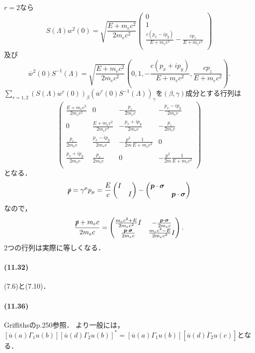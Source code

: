 $r=2$なら
\[S(\Lambda)w^2(0)=\sqrt{\frac{E + m_ec^2}{2m_ec^2}}
\begin{pmatrix}
  0\\
  1\\
  \frac{c(p_x - ip_y)}{E + m_ec^2}
   - \frac{cp_z}{E + m_ec^2}\\
\end{pmatrix}
\]
及び
\[\overline{w}^2(0)S^{ - 1}(\Lambda)=\sqrt{\frac{E + m_ec^2}{2m_ec^2}}\left(0,1, - \frac{c(p_x + ip_y)}{E + m_ec^2},\frac{cp_z}{E + m_ec^2}\right). \]
$\sum_{r=1,2}(S(\Lambda)w^r(0))_\beta(\overline{w}^r(0)S^{ - 1}(\Lambda))_\gamma$を$(\beta,\gamma)$成分とする行列は
\[
\begin{pmatrix}
  \frac{E + m_ec^2}{2m_ec^2} & 0 &  - \frac{p_z}{2m_ec} &  - \frac{p_x - ip_y}{2m_ec}\\
  0 & \frac{E + m_ec^2}{2m_ec^2} &  - \frac{p_x + ip_y}{2m_ec} &  - \frac{p_z}{2m_ec}\\
  \frac{p_z}{2m_ec} & \frac{p_x - ip_y}{2m_ec} &  - \frac{p^2}{2m}\frac{1}{E + m_ec^2} & 0\\
  \frac{p_x + ip_y}{2m_ec} & \frac{p_z}{2m_ec} & 0 &  - \frac{p^2}{2m}\frac{1}{E + m_ec^2}\\
\end{pmatrix}
\]
となる．
\[\slashed{p} =\gamma^\mu p_\mu=\frac{E}{c}
\begin{pmatrix}
I & \\
& I
\end{pmatrix}
 -
\begin{pmatrix}
  \boldsymbol{p}\cdot\boldsymbol\sigma & \\
  & \boldsymbol{p}\cdot\boldsymbol\sigma
\end{pmatrix}
\]
なので，
\[\frac{\slashed{p}  + m_ec}{2m_ec}=
\begin{pmatrix}
  \frac{m_ec^2 + E}{2m_ec^2}I &  - \frac{\boldsymbol{p}\cdot\boldsymbol\sigma}{2m_ec}\\
  \frac{\boldsymbol{p}\cdot\boldsymbol\sigma}{2m_ec} & \frac{m_ec^2 - E}{2m_ec^2}I
\end{pmatrix}
.\]
2つの行列は実際に等しくなる．

\paragraph{(11.32)}
(7.6)と(7.10)．

\paragraph{(11.36)}
Griffithsのp.250参照．
より一般には，$[\overline{u}(a)\Gamma_1 u(b)][\overline{u}(d)\Gamma_2 u(b)]^*=[\overline{u}(a)\Gamma_1 u(b)][\overline{u}(d)\overline{\Gamma}_2 u(c)]$となる．
